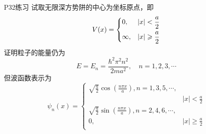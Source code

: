 \begin{question}{P32练习}
    试取无限深方势阱的中心为坐标原点，即
    $$
        V(x) = \begin{dcases}
            0,      & |x|<\frac{a}{2}          \\
            \infty, & |x|\geqslant \frac{a}{2} \\
        \end{dcases}
    $$
    证明粒子的能量仍为
    $$
        E = E_n = \frac{\hbar^2\pi^2n^2}{2ma^2}, \quad n=1,2,3,\cdots
    $$
    但波函数表示为
    $$
        \psi_n(x) = \begin{cases}
            \sqrt{\frac{a}{2}}\cos\left(\frac{n\pi x}{a}\right), n=1,3,5,\cdots, \\
               & |x|<\frac{a}{2}                                                 \\
            \sqrt{\frac{a}{2}}\sin\left(\frac{n\pi x}{a}\right), n=2,4,6,\cdots, \\
            0, & |x|\geqslant\frac{a}{2}                                         \\
        \end{cases}
    $$
\end{question}
